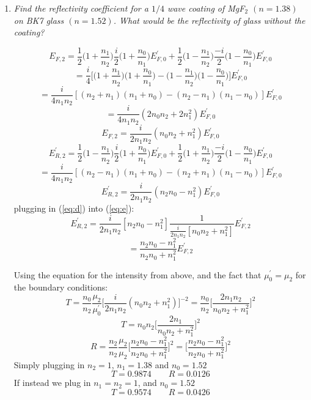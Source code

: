 \documentclass[12pt]{article}
\begin{document}
\begin{enumerate}[label=\alph*)]
\item {\sl Find the reflectivity coefficient for a $1/4$ wave coating of MgF$_2$ $(n=1.38)$ on BK7 glass $(n=1.52)$. What would be the reflectivity of glass without the coating?}

\[E_{F,2} = \frac{1}{2}\Big(1 + \frac{n_1}{n_2}\Big)\frac{i}{2}\Big(1+\frac{n_0}{n_1}\Big)E^\prime_{F,0}
+ \frac{1}{2}\Big(1 - \frac{n_1}{n_2}\Big)\frac{-i}{2}\Big(1-\frac{n_0}{n_1}\Big)E^\prime_{F,0}\]
\[= \frac{i}{4}\Big[\Big(1+\frac{n_1}{n_2}\Big)\Big(1+\frac{n_0}{n_1}\Big) - \Big(1-\frac{n_1}{n_2}\Big)\Big(1-\frac{n_0}{n_1}\Big)\Big]E^\prime_{F,0}\]
\[= \frac{i}{4n_1n_2}[(n_2 + n_1)(n_1 + n_0) - (n_2-n_1)(n_1-n_0)]E^\prime_{F,0}\]
\[= \frac{i}{4n_1n_2}(2n_0n_2+2n_1^2)E^\prime_{F,0}\]
\begin{equation}
E_{F,2} = \frac{i}{2n_1n_2}(n_0n_2 + n_1^2)E^\prime_{F,0}
\label{eq:d}
\end{equation}\bigskip
\[E^\prime_{R,2} = \frac{1}{2}\Big(1-\frac{n_1}{n_2}\Big)\frac{i}{2}\Big(1+\frac{n_0}{n_1}\Big)E^\prime_{F,0}
+ \frac{1}{2}\Big(1+\frac{n_1}{n_2}\Big)\frac{-i}{2}\Big(1-\frac{n_0}{n_1}\Big)E^\prime_{F,0}\]
\[=\frac{i}{4n_1n_2}[(n_2-n_1)(n_1+n_0)- (n_2+n_1)(n_1-n_0)]E^\prime_{F,0}\]
\begin{equation}
E^\prime_{R,2} = \frac{i}{2n_1n_2}(n_2n_0-n_1^2)E^\prime_{F,0}
\label{eq:e}
\end{equation}\bigskip
plugging in (\ref{eq:d}) into (\ref{eq:e}):
\[E^\prime_{R,2} = \frac{i}{2n_1n_2}[n_2n_0 - n_1^2]\frac{1}{\frac{i}{2n_1n_2}[n_0n_2 + n_1^2]}E^\prime_{F,2}\]
\[= \frac{n_2n_0 - n_1^2}{n_2n_0 + n_1^2}E^\prime_{F,2}\]

Using the equation for the intensity from above, and the fact that $\mu^\prime_0 = \mu_2$ for the boundary conditions:
\[T = \frac{n_0}{n_2}\frac{\mu_2}{\mu^\prime_0}\Big[\frac{i}{2n_1n_2}(n_0n_2 + n_1^2)\Big]^{-2} = \frac{n_0}{n_2}\Big[\frac{2n_1n_2}{n_0n_2 + n_1^2}\Big]^{2}\]
\[T = n_0n_2\Big[\frac{2n_1}{n_0n_2 + n_1^2}\Big]^2\]
\[R = \frac{n_2}{n_2}\frac{\mu_2}{\mu_2}\Big[\frac{n_2n_0 - n_1^2}{n_2n_0 + n_1^2}\Big]^2 = \Big[\frac{n_2n_0 - n_1^2}{n_2n_0 + n_1^2}\Big]^2\]\smallskip
Simply plugging in $n_2 = 1$, $n_1 = 1.38$ and $n_0 = 1.52$
\[\boxed{T = 0.9874} \qquad \boxed{R = 0.0126}\]
If instead we plug in $n_1 = n_2 = 1$, and $n_0 = 1.52$
\[\boxed{T = 0.9574} \qquad \boxed{R = 0.0426}\]


\end{enumerate}
\end{document}
